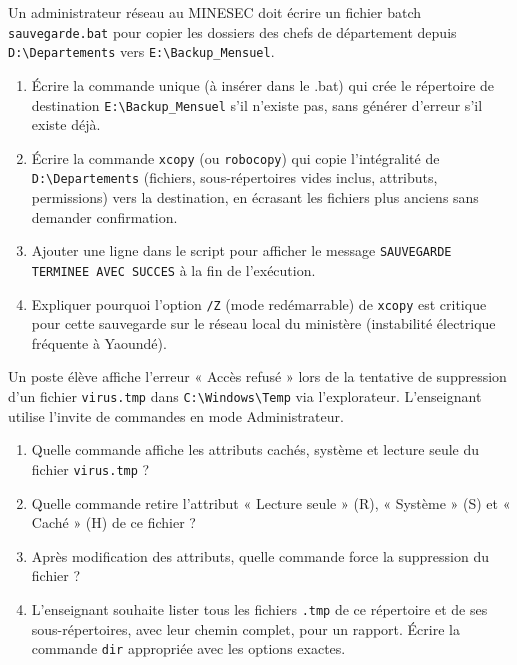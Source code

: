 \documentclass[11pt]{article}
\begin{document}
\begin{exercice}
Un administrateur réseau au MINESEC doit écrire un fichier batch \texttt{sauvegarde.bat} pour copier les dossiers des chefs de département depuis \texttt{D:\textbackslash Departements} vers \texttt{E:\textbackslash Backup\_Mensuel}.
\begin{enumerate}
    \item Écrire la commande unique (à insérer dans le .bat) qui crée le répertoire de destination \texttt{E:\textbackslash Backup\_Mensuel} s'il n'existe pas, sans générer d'erreur s'il existe déjà.
    \item Écrire la commande \texttt{xcopy} (ou \texttt{robocopy}) qui copie l'intégralité de \texttt{D:\textbackslash Departements} (fichiers, sous-répertoires vides inclus, attributs, permissions) vers la destination, en écrasant les fichiers plus anciens sans demander confirmation.
    \item Ajouter une ligne dans le script pour afficher le message \texttt{SAUVEGARDE TERMINEE AVEC SUCCES} à la fin de l'exécution.
    \item Expliquer pourquoi l'option \texttt{/Z} (mode redémarrable) de \texttt{xcopy} est critique pour cette sauvegarde sur le réseau local du ministère (instabilité électrique fréquente à Yaoundé).
\end{enumerate}
\end{exercice}

\begin{exercice}
Un poste élève affiche l'erreur « Accès refusé » lors de la tentative de suppression d'un fichier \texttt{virus.tmp} dans \texttt{C:\textbackslash Windows\textbackslash Temp} via l'explorateur. L'enseignant utilise l'invite de commandes en mode Administrateur.
\begin{enumerate}
    \item Quelle commande affiche les attributs cachés, système et lecture seule du fichier \texttt{virus.tmp} ?
    \item Quelle commande retire l'attribut « Lecture seule » (R), « Système » (S) et « Caché » (H) de ce fichier ?
    \item Après modification des attributs, quelle commande force la suppression du fichier ?
    \item L'enseignant souhaite lister tous les fichiers \texttt{.tmp} de ce répertoire et de ses sous-répertoires, avec leur chemin complet, pour un rapport. Écrire la commande \texttt{dir} appropriée avec les options exactes.
\end{enumerate}
\end{exercice}
\end{document}
